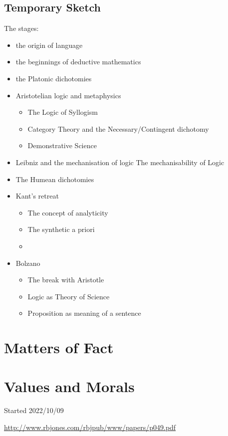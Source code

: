 \documentclass[10pt,titlepage]{article}
\begin{document}
\subsection{Temporary Sketch}

The stages:

\begin{itemize}
\item the origin of language
\item the beginnings of deductive mathematics
\item the Platonic dichotomies
\item Aristotelian logic and metaphysics
  \begin{itemize}
\item  The Logic of Syllogism
\item  Category Theory and the Necessary/Contingent dichotomy
\item  Demonstrative Science
  \end{itemize}
\item Leibniz and the mechanisation of logic
  The mechanisability of Logic
\item The Humean dichotomies
\item Kant's retreat
  \begin{itemize}
\item   The concept of analyticity
\item   The synthetic a priori
\item   \end{itemize}
\item Bolzano
  \begin{itemize}
\item   The break with Aristotle
\item   Logic as Theory of Science
\item   Proposition as meaning of a sentence
  \end{itemize}

\end{itemize}

\section{Matters of Fact}


\section{Values and Morals}


{}





\tiny{
Started 2022/10/09

\href{http://www.rbjones.com/rbjpub/www/papers/p049.pdf}{http://www.rbjones.com/rbjpub/www/papers/p049.pdf}

}%
\end{document}
